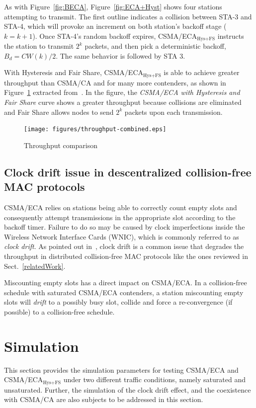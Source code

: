 \documentclass[a4paper,journal]{IEEEtran}
\begin{document}
	As with Figure~\ref{fig:BECA}, Figure~\ref{fig:ECA+Hyst} shows four stations attempting to transmit. The first outline indicates a collision between STA-3 and STA-4, which will provoke an increment on both station's backoff stage ($k=k+1$). Once STA-4's random backoff expires, CSMA/ECA$_{\text{Hys+FS}}$ instructs the station to transmit $2^{k}$ packets, and then pick a deterministic backoff, $B_{d}=CW(k)/2$. The same behavior is followed by STA 3.
	
	With Hysteresis and Fair Share, CSMA/ECA$_{\text{Hys+FS}}$ is able to achieve greater throughput than CSMA/CA and for many more contenders, as shown in Figure~\ref{fig:ECA+H+F-throughput} extracted from~\cite{research2standards}. In the figure, the \emph{CSMA/ECA with Hysteresis and Fair Share} curve shows a greater throughput because collisions are eliminated and Fair Share allows nodes to send $2^{k}$ packets upon each transmission.

	\begin{figure}[htbp]
	\centering
		\texttt{[image: figures/throughput-combined.eps]}
		\caption{Throughput comparison~\cite{research2standards}}
		\label{fig:ECA+H+F-throughput}
	\end{figure}
	
	\subsection{Clock drift issue in descentralized collision-free MAC protocols}\label{clockDrift-issue}
	CSMA/ECA relies on stations being able to correctly count empty slots and consequently attempt transmissions in the appropriate slot according to the backoff timer. Failure to do so may be caused by clock imperfections inside the Wireless Network Interface Cards (WNIC), which is commonly referred to as \emph{clock drift}. As pointed out in~\cite{slotDrift}, clock drift is a common issue that degrades the throughput in distributed collision-free MAC protocols like the ones reviewed in Sect.~\ref{relatedWork}.
	
	Miscounting empty slots has a direct impact on CSMA/ECA. In a collision-free schedule with saturated CSMA/ECA contenders, a station miscounting empty slots will \emph{drift} to a possibly busy slot, collide and force a re-convergence (if possible) to a collision-free schedule. 
	
\section{Simulation}\label{simulations}
This section provides the simulation parameters for testing CSMA/ECA and CSMA/ECA$_{\text{Hys+FS}}$ under two different traffic conditions, namely saturated and unsaturated. Further, the simulation of the clock drift effect, and the coexistence with CSMA/CA are also subjects to be addressed in this section.
\end{document}
